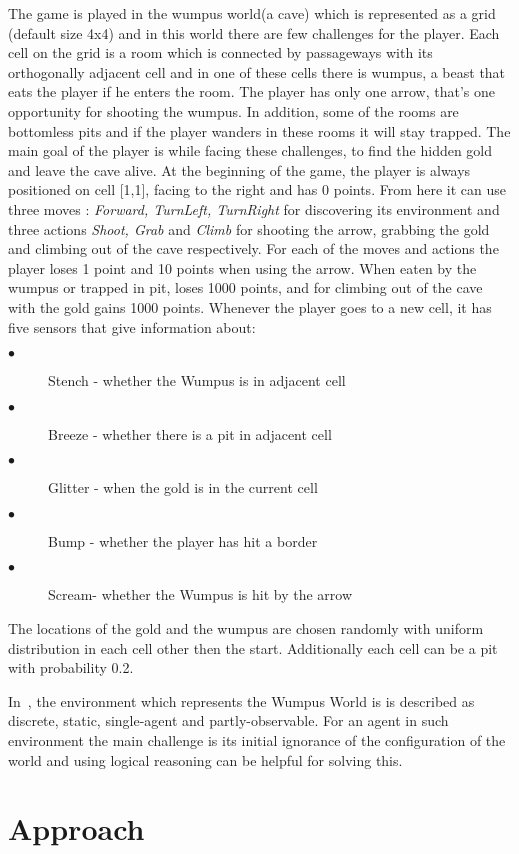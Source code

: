 \documentclass{llncs}
\begin{document}
The game is played in the wumpus world(a cave) which is represented as a grid (default size 4x4) and in this world there are few challenges for the player. Each cell on the grid is a room which is connected by passageways with its orthogonally adjacent cell and in one of these cells there is wumpus, a beast that eats the player if he enters the room. The player has only one arrow, that's one opportunity for shooting the wumpus. In addition, some of the rooms are bottomless pits and if the player wanders in these rooms it will stay trapped. The main goal of the player is while facing these challenges, to find the hidden gold and leave the cave alive. At the beginning of the game, the player is always positioned on cell [1,1], facing to the right and has 0 points. From here it can use three moves : \emph{Forward, TurnLeft, TurnRight} for discovering its environment and three actions \emph{Shoot, Grab} and \emph{ Climb} for shooting the arrow, grabbing the gold and climbing out of the cave respectively. For each of the moves and actions the player loses 1 point and 10 points when using the arrow. When eaten by the wumpus or trapped in pit, loses 1000 points, and for climbing out of the cave with the gold gains 1000 points. Whenever the player goes to a new cell, it has five sensors that give information about:
\begin{description}
	\item [$\bullet$] Stench - whether the Wumpus is in adjacent cell 
	\item [$\bullet$] Breeze - whether there is a pit in adjacent cell	
	\item [$\bullet$] Glitter - when the gold is in the current cell
	\item [$\bullet$] Bump - whether the player has hit a border
	\item [$\bullet$] Scream- whether the Wumpus is hit by the arrow 
\end{description}
The locations of the gold and the wumpus are chosen randomly with uniform distribution in each cell other then the start. Additionally each cell can be a pit with probability 0.2.

In~\cite{book:aima}, the environment which represents the Wumpus World is is described as discrete, static, single-agent and partly-observable. For an agent in such environment the main challenge is its initial ignorance of the configuration of the world and using logical reasoning can be helpful for solving this. 

\section{Approach}
\end{document}
